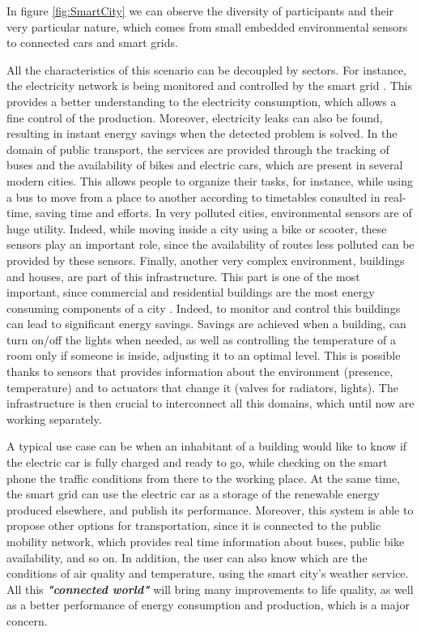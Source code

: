 In figure \ref{fig:SmartCity} we can observe the diversity of participants and their very particular nature, which comes from small embedded environmental sensors to connected cars and smart grids.

All the characteristics of this scenario can be decoupled by sectors.
For instance, the electricity network is being monitored and controlled by the smart grid \cite{farhangi2010path}.
This provides a better understanding to the electricity consumption, which allows a fine control of the production.
Moreover, electricity leaks can also be found, resulting in instant energy savings when the detected problem is solved.
In the domain of public transport, the services are provided through the tracking of buses and the availability of bikes and electric cars, which are present in several modern cities.
This allows people to organize their tasks, for instance, while using a bus to move from a place to another according to timetables consulted in real-time, saving time and efforts.
In very polluted cities, environmental sensors are of huge utility.
Indeed, while moving inside a city using a bike or scooter, these sensors play an important role, since the availability of routes less polluted can be provided by these sensors.
Finally, another very complex environment, buildings and houses, are part of this infrastructure.
This part is one of the most important, since commercial and residential buildings are the most energy consuming components of a city \cite{perez2008review}.
Indeed, to monitor and control this buildings can lead to significant energy savings.
Savings are achieved when a building, can turn on/off the lights when needed, as well as controlling the temperature of a room only if someone is inside, adjusting it to an optimal level.
This is possible thanks to sensors that provides information about the environment (presence, temperature) and to actuators that change it (valves for radiators, lights).
The infrastructure is then crucial to interconnect all this domains, which until now are working separately. 


A typical use case can be when an inhabitant of a building would like to know if the electric car is fully charged and ready to go, while checking on the smart phone the traffic conditions from there to the working place.
At the same time, the smart grid can use the electric car as a storage of the renewable energy produced elsewhere, and publish its performance.
Moreover, this system is able to propose other options for transportation, since it is connected to the public mobility network, which provides real time information about buses, public bike availability, and so on.
In addition, the user can also know which are the conditions of air quality and temperature, using the smart city's weather service.
All this \textit{\textbf{"connected world"}} will bring many improvements to life quality, as well as a better performance of energy consumption and production, which is a major concern.

